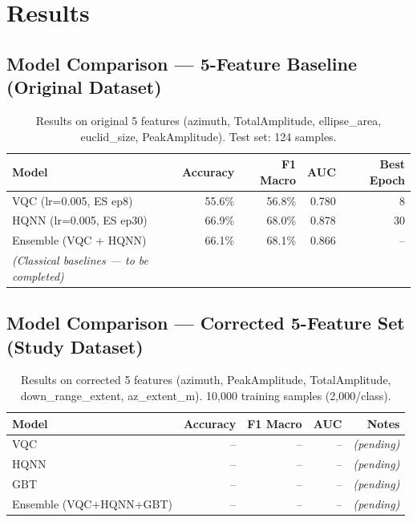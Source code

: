 \documentclass[12pt, a4paper]{article}
\begin{document}
\section{Results}
\label{sec:results}

\subsection{Model Comparison — 5-Feature Baseline (Original Dataset)}

\begin{table}[H]
\centering
\caption{Results on original 5 features (azimuth, TotalAmplitude, ellipse\_area,
euclid\_size, PeakAmplitude). Test set: 124 samples.}
\label{tab:results_5feat}
\begin{tabular}{lrrrr}
\toprule
\textbf{Model} & \textbf{Accuracy} & \textbf{F1 Macro} & \textbf{AUC} & \textbf{Best Epoch} \\
\midrule
VQC (lr=0.005, ES ep8)           & 55.6\% & 56.8\% & 0.780 & 8 \\
HQNN (lr=0.005, ES ep30)         & 66.9\% & 68.0\% & 0.878 & 30 \\
Ensemble (VQC + HQNN)            & 66.1\% & 68.1\% & 0.866 & -- \\
\midrule
\textit{(Classical baselines — to be completed)} & & & & \\
\bottomrule
\end{tabular}
\end{table}

\subsection{Model Comparison — Corrected 5-Feature Set (Study Dataset)}

\begin{table}[H]
\centering
\caption{Results on corrected 5 features (azimuth, PeakAmplitude, TotalAmplitude,
down\_range\_extent, az\_extent\_m). 10,000 training samples (2,000/class).}
\label{tab:results_5feat_new}
\begin{tabular}{lrrrr}
\toprule
\textbf{Model} & \textbf{Accuracy} & \textbf{F1 Macro} & \textbf{AUC} & \textbf{Notes} \\
\midrule
VQC                     & -- & -- & -- & \textit{(pending)} \\
HQNN                    & -- & -- & -- & \textit{(pending)} \\
GBT                     & -- & -- & -- & \textit{(pending)} \\
Ensemble (VQC+HQNN+GBT) & -- & -- & -- & \textit{(pending)} \\
\bottomrule
\end{tabular}
\end{table}
\end{document}
